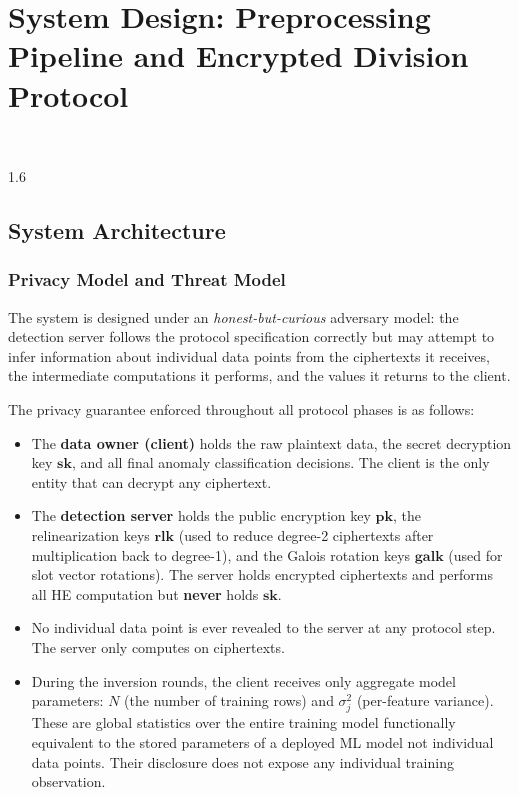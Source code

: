 \chapter{System Design: Preprocessing Pipeline and Encrypted Division Protocol}
\HRule\\[2cm]
\label{Chapter4}

\begin{spacing}{1.6}

\section{System Architecture}

\subsection{Privacy Model and Threat Model}

The system is designed under an \textit{honest-but-curious} adversary model:
the detection server follows the protocol specification correctly but may
attempt to infer information about individual data points from the ciphertexts
it receives, the intermediate computations it performs, and the values it
returns to the client.

The privacy guarantee enforced throughout all protocol phases is as follows:

\begin{itemize}
  \item The \textbf{data owner (client)} holds the raw plaintext data, the
  secret decryption key $\mathbf{sk}$, and all final anomaly classification
  decisions. The client is the only entity that can decrypt any ciphertext.

  \item The \textbf{detection server} holds the public encryption key
  $\mathbf{pk}$, the relinearization keys $\mathbf{rlk}$ (used to reduce
  degree-2 ciphertexts after multiplication back to degree-1), and the Galois
  rotation keys $\mathbf{galk}$ (used for slot vector rotations). The server
  holds encrypted ciphertexts and performs all HE computation but
  \textbf{never} holds $\mathbf{sk}$.

  \item No individual data point is ever revealed to the server at any protocol
  step. The server only computes on ciphertexts.

  \item During the inversion rounds, the client receives only aggregate model
  parameters: $N$ (the number of training rows) and $\sigma_j^2$ (per-feature
  variance). These are global statistics over the entire training model 
  functionally equivalent to the stored parameters of a deployed ML model 
  not individual data points. Their disclosure does not expose any individual
  training observation.
\end{itemize}


\end{spacing}
